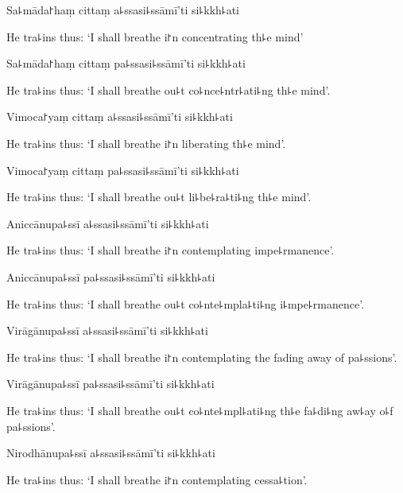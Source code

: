 Sa꜕māda꜓haṃ cittaṃ a꜕ssasi꜕ssāmī'ti si꜕kkh꜕ati

\begin{english}
  He tra꜕ins thus: `I shall breathe i꜓n concentrating th꜕e mind'
\end{english}

Sa꜕māda꜓haṃ cittaṃ pa꜕ssasi꜕ssāmī'ti si꜕kkh꜕ati

\begin{english}
  He tra꜕ins thus: `I shall breathe ou꜕t co꜕nce꜕ntr꜕ati꜕ng th꜕e mind'.
\end{english}

Vimoca꜓yaṃ cittaṃ a꜕ssasi꜕ssāmī'ti si꜕kkh꜕ati

\begin{english}
  He tra꜕ins thus: `I shall breathe i꜓n liberating th꜕e mind'.
\end{english}

Vimoca꜓yaṃ cittaṃ pa꜕ssasi꜕ssāmī'ti si꜕kkh꜕ati

\begin{english}
  He tra꜕ins thus: `I shall breathe ou꜕t li꜕be꜕ra꜕ti꜕ng th꜕e mind'.
\end{english}

Aniccānupa꜕ssī a꜕ssasi꜕ssāmī'ti si꜕kkh꜕ati

\begin{english}
  He tra꜕ins thus: `I shall breathe i꜓n contemplating impe꜕rmanence'.
\end{english}

Aniccānupa꜕ssī pa꜕ssasi꜕ssāmī'ti si꜕kkh꜕ati

\begin{english}
  He tra꜕ins thus: `I shall breathe ou꜕t co꜕nte꜕mpla꜕ti꜕ng i꜕mpe꜕rmanence'.
\end{english}

Virāgānupa꜕ssī a꜕ssasi꜕ssāmī'ti si꜕kkh꜕ati

\begin{english}
  He tra꜕ins thus: `I shall breathe i꜓n contemplating the fading away of pa꜕ssions'.
\end{english}

Virāgānupa꜕ssī pa꜕ssasi꜕ssāmī'ti si꜕kkh꜕ati

\begin{english}
  He tra꜕ins thus: `I shall breathe ou꜕t co꜕nte꜕mpl꜕ati꜕ng th꜕e fa꜕di꜕ng aw꜕ay o꜕f pa꜕ssions'.
\end{english}

Nirodhānupa꜕ssī a꜕ssasi꜕ssāmī'ti si꜕kkh꜕ati

\begin{english}
  He tra꜕ins thus: `I shall breathe i꜓n contemplating cessa꜕tion'.
\end{english}

